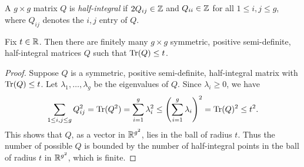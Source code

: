 \documentclass{amsart}
\begin{document}
\begin{definition}
  A $g \times g$ matrix $Q$ is \emph{half-integral} if $2Q_{ij} \in \mathbb{Z}$ and $Q_{ii} \in \mathbb{Z}$ for all $1 \leq i,j \leq g$, where $Q_{ij}$ denotes the $i,j$ entry of $Q$.
\end{definition}

\begin{lemma}\label{lem:finite-fixed-trace}
 Fix $t\in\mathbb{R}$. Then there are finitely many $g \times g$ symmetric, positive semi-definite, half-integral matrices $Q$ such that $\operatorname{Tr}(Q) \leq t$.
\end{lemma}
\begin{proof}
  Suppose $Q$ is a symmetric, positive semi-definite, half-integral matrix with $\operatorname{Tr}(Q) \leq t$. Let $\lambda_1,\dots,\lambda_g$ be the eigenvalues of $Q$. Since $\lambda_i \geq 0$, we have
  \[
    \sum_{1 \leq i,j \leq g} Q_{ij}^2 = \operatorname{Tr}(Q^2) = \sum_{i=1}^g \lambda_i^2 \leq \left(\sum_{i=1}^g \lambda_i\right)^2 = \operatorname{Tr}(Q)^2 \leq t^2.
  \]
  This shows that $Q$, as a vector in $\mathbb{R}^{g^2}$, lies in the ball of radius $t$. Thus the number of possible $Q$ is bounded by the number of half-integral points in the ball of radius $t$ in $\mathbb{R}^{g^2}$, which is finite.
\end{proof}

\end{document}
